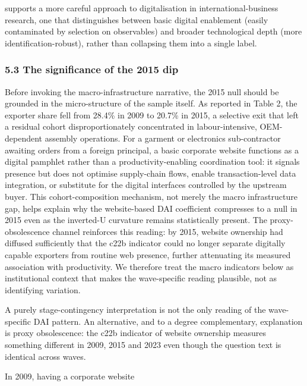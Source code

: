 \documentclass[12pt,a4paper]{article}
\begin{document}
supports a more careful approach to digitalisation in
international-business research, one that distinguishes between basic
digital enablement (easily contaminated by selection on observables) and
broader technological depth (more identification-robust), rather than
collapsing them into a single label.

\hypertarget{53-the-significance-of-the-2015-dip}{%
\subsubsection{5.3 The significance of the 2015
dip}\label{53-the-significance-of-the-2015-dip}}

Before invoking the macro-infrastructure narrative, the 2015 null should
be grounded in the micro-structure of the sample itself. As reported in
Table 2, the exporter share fell from 28.4\% in 2009 to 20.7\% in 2015,
a selective exit that left a residual cohort disproportionately
concentrated in labour-intensive, OEM-dependent assembly operations. For
a garment or electronics sub-contractor awaiting orders from a foreign
principal, a basic corporate website functions as a digital pamphlet
rather than a productivity-enabling coordination tool: it signals
presence but does not optimise supply-chain flows, enable
transaction-level data integration, or substitute for the digital
interfaces controlled by the upstream buyer. This cohort-composition
mechanism, not merely the macro infrastructure gap, helps explain why
the website-based DAI coefficient compresses to a null in 2015 even as
the inverted-U curvature remains statistically present. The
proxy-obsolescence channel reinforces this reading: by 2015, website
ownership had diffused sufficiently that the c22b indicator could no
longer separate digitally capable exporters from routine web presence,
further attenuating its measured association with productivity. We
therefore treat the macro indicators below as institutional context that
makes the wave-specific reading plausible, not as identifying variation.

A purely stage-contingency interpretation is not the only reading of the
wave-specific DAI pattern. An alternative, and to a degree
complementary, explanation is proxy obsolescence: the c22b indicator of
website ownership measures something different in 2009, 2015 and 2023
even though the question text is identical across waves.

In 2009, having a corporate website
\end{document}
